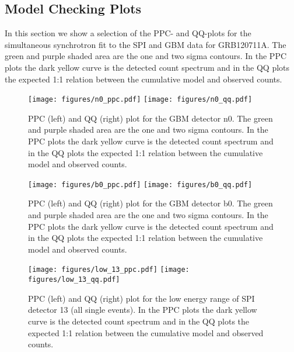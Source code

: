 \documentclass[twocolumn,traditabstract]{aa}
\begin{document}
\begin{appendix}
\onecolumn
  \section{Model Checking Plots}
  \label{appendix}
  In this section we show a selection of the PPC- and QQ-plots for the simultaneous synchrotron fit to the SPI and GBM data for GRB120711A. The green and purple shaded area are the one and two sigma contours. In the PPC plots the dark yellow curve is the detected count spectrum and in the QQ plots the expected 1:1 relation between the cumulative model and observed counts.

  \begin{figure*}[ht]
    \begin{centering}
      \texttt{[image: figures/n0\_ppc.pdf]}
      \texttt{[image: figures/n0\_qq.pdf]}
      \caption{PPC (left) and QQ (right) plot for the GBM detector n0. The green and purple shaded area are the one and two sigma contours. In the PPC plots the dark yellow curve is the detected count spectrum and in the QQ plots the expected 1:1 relation between the cumulative model and observed counts.}
      \label{fig:n0_model_check}
    \end{centering}
  \end{figure*}
  \begin{figure*}[ht]
    \begin{centering}
      \texttt{[image: figures/b0\_ppc.pdf]}
      \texttt{[image: figures/b0\_qq.pdf]}
      \caption{PPC (left) and QQ (right) plot for the GBM detector b0. The green and purple shaded area are the one and two sigma contours. In the PPC plots the dark yellow curve is the detected count spectrum and in the QQ plots the expected 1:1 relation between the cumulative model and observed counts.}
      \label{fig:b0_model_check}
    \end{centering}
  \end{figure*}

  \begin{figure*}[ht]
    \begin{centering}
      \texttt{[image: figures/low\_13\_ppc.pdf]}
      \texttt{[image: figures/low\_13\_qq.pdf]}
      \caption{PPC (left) and QQ (right) plot for the low energy range of SPI detector 13 (all single events). In the PPC plots the dark yellow curve is the detected count spectrum and in the QQ plots the expected 1:1 relation between the cumulative model and observed counts.}
      \label{fig:low_13_model_check}
    \end{centering}
  \end{figure*}


\end{appendix}
\end{document}
